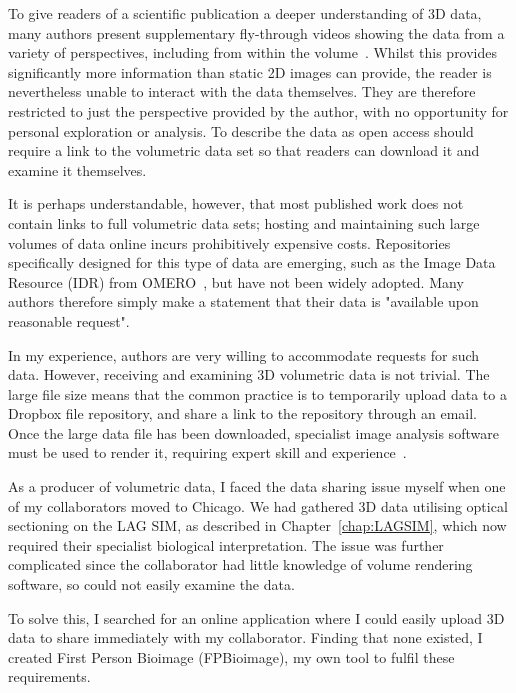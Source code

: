 To give readers of a scientific publication a deeper understanding of 3D data, many authors present supplementary fly-through videos showing the data from a variety of perspectives, including from within the volume~\cite{legant2016high, fu2016imaging, chhetri2015whole, huang2016ultra}. 
Whilst this provides significantly more information than static 2D images can provide, the reader is nevertheless unable to interact with the data themselves. 
They are therefore restricted to just the perspective provided by the author, with no opportunity for personal exploration or analysis.
To describe the data as open access should require a link to the volumetric data set so that readers can download it and examine it themselves. 

It is perhaps understandable, however, that most published work does not contain links to full volumetric data sets; hosting and maintaining such large volumes of data online incurs prohibitively expensive costs. 
Repositories specifically designed for this type of data are emerging, such as the Image Data Resource (IDR) from OMERO~\cite{williams2017image}, but have not been widely adopted. 
Many authors therefore simply make a statement that their data is "available upon reasonable request". 

In my experience, authors are very willing to accommodate requests for such data. 
However, receiving and examining 3D volumetric data is not trivial. 
The large file size means that the common practice is to temporarily upload data to a Dropbox file repository, and share a link to the repository through an email. 
Once the large data file has been downloaded, specialist image analysis software must be used to render it, requiring expert skill and experience~\cite{broeke2015image}. 

As a producer of volumetric data, I faced the data sharing issue myself when one of my collaborators moved to Chicago. 
We had gathered 3D data utilising optical sectioning on the LAG SIM, as described in Chapter~\ref{chap:LAGSIM}, which now required their specialist biological interpretation. 
The issue was further complicated since the collaborator had little knowledge of volume rendering software, so could not easily examine the data. 

To solve this, I searched for an online application where I could easily upload 3D data to share immediately with my collaborator. 
Finding that none existed, I created First Person Bioimage (FPBioimage), my own tool to fulfil these requirements.

